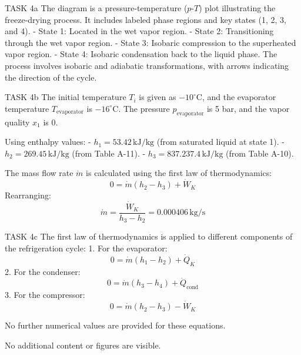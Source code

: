 TASK 4a  
The diagram is a pressure-temperature (\( p \)-\( T \)) plot illustrating the freeze-drying process. It includes labeled phase regions and key states (1, 2, 3, and 4).  
- State 1: Located in the wet vapor region.  
- State 2: Transitioning through the wet vapor region.  
- State 3: Isobaric compression to the superheated vapor region.  
- State 4: Isobaric condensation back to the liquid phase.  
The process involves isobaric and adiabatic transformations, with arrows indicating the direction of the cycle.  

TASK 4b  
The initial temperature \( T_i \) is given as \( -10^\circ\text{C} \), and the evaporator temperature \( T_{\text{evaporator}} \) is \( -16^\circ\text{C} \).  
The pressure \( p_{\text{evaporator}} \) is 5 bar, and the vapor quality \( x_1 \) is 0.  

Using enthalpy values:  
- \( h_1 = 53.42 \, \text{kJ/kg} \) (from saturated liquid at state 1).  
- \( h_2 = 269.45 \, \text{kJ/kg} \) (from Table A-11).  
- \( h_3 = 837.237.4 \, \text{kJ/kg} \) (from Table A-10).  

The mass flow rate \( \dot{m} \) is calculated using the first law of thermodynamics:  
\[
0 = \dot{m} \left( h_2 - h_3 \right) + \dot{W}_K  
\]
Rearranging:  
\[
\dot{m} = \frac{\dot{W}_K}{h_3 - h_2} = 0.000406 \, \text{kg/s}  
\]

TASK 4c  
The first law of thermodynamics is applied to different components of the refrigeration cycle:  
1. For the evaporator:  
\[
0 = \dot{m} \left( h_1 - h_2 \right) + \dot{Q}_K  
\]  
2. For the condenser:  
\[
0 = \dot{m} \left( h_3 - h_4 \right) + \dot{Q}_{\text{cond}}  
\]  
3. For the compressor:  
\[
0 = \dot{m} \left( h_2 - h_3 \right) - \dot{W}_K  
\]  

No further numerical values are provided for these equations.  

No additional content or figures are visible.